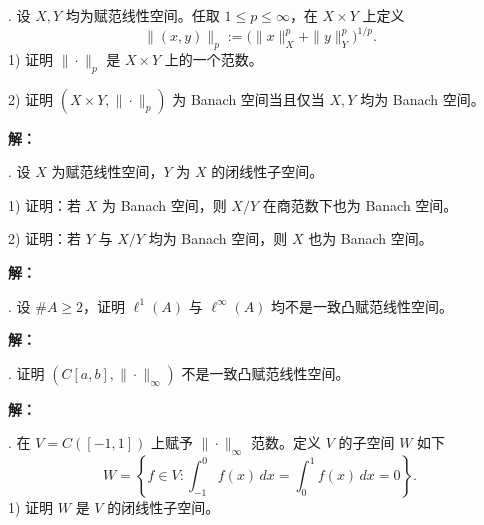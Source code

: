 \documentclass{article}
\begin{document}
\par\medskip{}. 设 $X,Y$ 均为赋范线性空间。任取 $1\le p\le\infty$，在 $X\times Y$ 上定义
\[
\|(x,y)\|_p:=\bigl(\|x\|_X^p+\|y\|_Y^p\bigr)^{1/p}.
\]
1) 证明 $\|\cdot\|_p$ 是 $X\times Y$ 上的一个范数。

2) 证明 $(X\times Y,\|\cdot\|_p)$ 为 Banach 空间当且仅当 $X,Y$ 均为 Banach 空间。


\par\nopagebreak[4]\noindent\textbf{解：}



\par\medskip

\par\medskip{}. 设 $X$ 为赋范线性空间，$Y$ 为 $X$ 的闭线性子空间。

1) 证明：若 $X$ 为 Banach 空间，则 $X/Y$ 在商范数下也为 Banach 空间。

2) 证明：若 $Y$ 与 $X/Y$ 均为 Banach 空间，则 $X$ 也为 Banach 空间。


\par\nopagebreak[4]\noindent\textbf{解：}



\par\medskip

\par\medskip{}. 设 $\#A\ge2$，证明 $\ell^1(A)$ 与 $\ell^\infty(A)$ 均不是一致凸赋范线性空间。


\par\nopagebreak[4]\noindent\textbf{解：}



\par\medskip

\par\medskip{}. 证明 $(C[a,b],\|\cdot\|_\infty)$ 不是一致凸赋范线性空间。


\par\nopagebreak[4]\noindent\textbf{解：}



\par\medskip

\par\medskip{}. 在 $V=C([-1,1])$ 上赋予 $\|\cdot\|_\infty$ 范数。定义 $V$ 的子空间 $W$ 如下
\[
W=\left\{f\in V:\int_{-1}^0 f(x)\,dx=\int_0^1 f(x)\,dx=0\right\}.
\]
1) 证明 $W$ 是 $V$ 的闭线性子空间。
\end{document}
